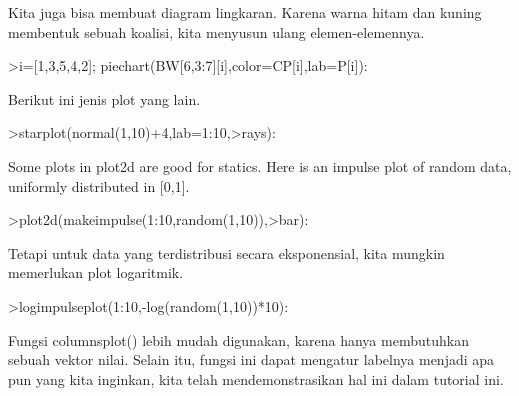 \documentclass[12pt,arial,letterpaper]{book}
\begin{document}
\begin{eulernootebook}
\begin{eulercomment}
\begin{eulercomment}
\begin{eulernootebook}
\begin{eulercomment}
\begin{eulercomment}
\begin{eulercomment}
\begin{eulercomment}
\begin{eulercomment}
\begin{eulercomment}
\begin{eulercomment}
\begin{eulercomment}
Kita juga bisa membuat diagram lingkaran. Karena warna hitam dan
kuning membentuk sebuah koalisi, kita menyusun ulang elemen-elemennya.
\end{eulercomment}
\begin{eulerprompt}
>i=[1,3,5,4,2]; piechart(BW[6,3:7][i],color=CP[i],lab=P[i]):
\end{eulerprompt}
\begin{eulercomment}
Berikut ini jenis plot yang lain.
\end{eulercomment}
\begin{eulerprompt}
>starplot(normal(1,10)+4,lab=1:10,>rays):
\end{eulerprompt}
\begin{eulercomment}
Some plots in plot2d are good for statics. Here is an impulse plot of random data, uniformly
distributed in [0,1].
\end{eulercomment}
\begin{eulerprompt}
>plot2d(makeimpulse(1:10,random(1,10)),>bar):
\end{eulerprompt}
\begin{eulercomment}
Tetapi untuk data yang terdistribusi secara eksponensial, kita mungkin
memerlukan plot logaritmik.
\end{eulercomment}
\begin{eulerprompt}
>logimpulseplot(1:10,-log(random(1,10))*10):
\end{eulerprompt}
\begin{eulercomment}
Fungsi columnsplot() lebih mudah digunakan, karena hanya membutuhkan
sebuah vektor nilai. Selain itu, fungsi ini dapat mengatur labelnya
menjadi apa pun yang kita inginkan, kita telah mendemonstrasikan hal
ini dalam tutorial ini.


\end{eulercomment}
\end{eulercomment}
\end{eulercomment}
\end{eulercomment}
\end{eulercomment}
\end{eulercomment}
\end{eulercomment}
\end{eulercomment}
\end{eulernootebook}
\end{eulercomment}
\end{eulercomment}
\end{eulernootebook}
\end{document}
